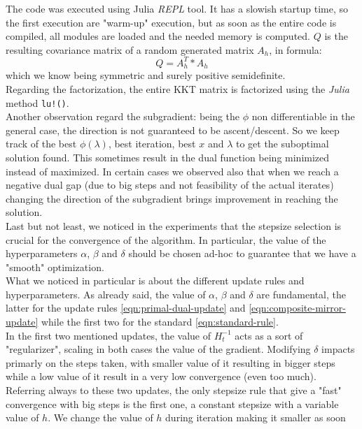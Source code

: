 \documentclass[notitlepage]{article}
\begin{document}
The code was executed using Julia \textit{REPL} tool. It has a slowish startup time, so the first execution are "warm-up" execution, but as soon as the entire code is compiled, all modules are loaded and the needed memory is computed. 
$Q$ is the resulting covariance matrix of a random generated matrix $A_h$, in formula: 
\[
  Q = A_h^T * A_h  
\]
which we know being symmetric and surely positive semidefinite.\\
Regarding the factorization, the entire KKT matrix is factorized using the \textit{Julia} method \texttt{lu!()}.\\
Another observation regard the subgradient: being the $\phi$ non differentiable in the general case, the direction is not guaranteed to be ascent/descent. So we keep track of the best $\phi(\lambda)$, best iteration, best $x$ 
and $\lambda$ to get the suboptimal solution found. This sometimes result in the dual function being minimized instead of maximized. In certain cases we observed also that when we reach a negative dual gap (due to big steps and not feasibility of the
actual iterates) changing the direction of the subgradient brings improvement in reaching the solution.\\
Last but not least, we noticed in the experiments that the stepsize selection is crucial for the convergence of the algorithm. In particular, the value of the hyperparameters $\alpha$, $\beta$ and $\delta$ should be chosen ad-hoc to guarantee 
that we have a "smooth" optimization.\\
What we noticed in particular is about the different update rules and hyperparameters. As already said, the value of $\alpha$, $\beta$ and $\delta$ are fundamental, the latter for the update rules \eqref{eqn:primal-dual-update} 
and \eqref{eqn:composite-mirror-update} while the first two for the standard \eqref{eqn:standard-rule}.\\
In the first two mentioned updates, the value of $H_t^{-1}$ acts as a sort of "regularizer", scaling in both cases the value of the gradient. Modifying $\delta$ impacts primarly on the steps taken, with smaller value of it resulting in 
bigger steps while a low value of it result in a very low convergence (even too much).\\
Referring always to these two updates, the only stepsize rule that give a "fast" convergence with big steps is the first one, a constant stepsize with a variable value of $h$. We change the value of $h$ during iteration making it smaller as soon 
\end{document}
